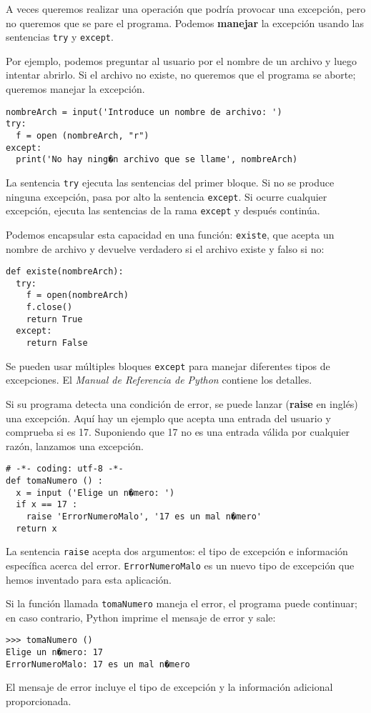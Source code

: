 
A veces queremos realizar una operación que podría provocar una excepción,
pero no queremos que se pare el programa. Podemos \textbf{manejar}
la excepción usando las sentencias \texttt{try} y \texttt{except}.

Por ejemplo, podemos preguntar al usuario por el nombre de un archivo
y luego intentar abrirlo. Si el archivo no existe, no queremos que
el programa se aborte; queremos manejar la excepción.
\begin{lstlisting}
nombreArch = input('Introduce un nombre de archivo: ')
try:
  f = open (nombreArch, "r")
except:
  print('No hay ning�n archivo que se llame', nombreArch)
\end{lstlisting}
La sentencia \texttt{try} ejecuta las sentencias del primer bloque.
Si no se produce ninguna excepción, pasa por alto la sentencia \texttt{except}.
Si ocurre cualquier excepción, ejecuta las sentencias de la rama \texttt{except}
y después continúa.

Podemos encapsular esta capacidad en una función: \texttt{existe},
que acepta un nombre de archivo y devuelve verdadero si el archivo
existe y falso si no:
\begin{lstlisting}
def existe(nombreArch):
  try:
    f = open(nombreArch)
    f.close()
    return True
  except:
    return False
\end{lstlisting}
Se pueden usar múltiples bloques \texttt{except} para manejar diferentes
tipos de excepciones. El {\em Manual de Referencia de Python} contiene
los detalles.

Si su programa detecta una condición de error, se puede lanzar (\textbf{raise}
en inglés) una excepción. Aquí hay un ejemplo que acepta una entrada
del usuario y comprueba si es 17. Suponiendo que 17 no es una entrada
válida por cualquier razón, lanzamos una excepción.
\begin{lstlisting}
# -*- coding: utf-8 -*-
def tomaNumero () :                 
  x = input ('Elige un n�mero: ')   
  if x == 17 :
    raise 'ErrorNumeroMalo', '17 es un mal n�mero'
  return x
\end{lstlisting}
La sentencia \texttt{raise} acepta dos argumentos: el tipo de excepción
e información específica acerca del error. \texttt{ErrorNumeroMalo}
es un nuevo tipo de excepción que hemos inventado para esta aplicación.

Si la función llamada \texttt{tomaNumero} maneja el error, el programa
puede continuar; en caso contrario, Python imprime el mensaje de error
y sale:
\begin{lstlisting}
>>> tomaNumero ()
Elige un n�mero: 17
ErrorNumeroMalo: 17 es un mal n�mero
\end{lstlisting}
El mensaje de error incluye el tipo de excepción y la información
adicional proporcionada.

